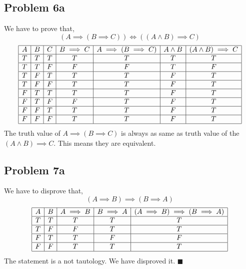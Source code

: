 \documentclass[answers]{exam}
\theoremstyle{mytheoremstyle}
\theoremstyle{mytheoremstyle}
\theoremstyle{myproblemstyle}
\begin{document}
\subsection*{Problem 6a}
\begin{framed}
	We have to prove that,
	\[(A\implies(B\implies C))\iff ((A\land B)\implies C)\]
	\begin{displaymath}
		\begin{array}{|c|c|c|c|c|c|c|}
			\hline
			A & B & C & B\implies C & A\implies(B\implies C) & A\land B & (A\land B)\implies C \\\hline
			T & T & T & T           & T                      & T        & T                    \\\hline
			T & T & F & F           & F                      & T        & F                    \\\hline
			T & F & T & T           & T                      & F        & T                    \\\hline
			T & F & F & T           & T                      & F        & T                    \\\hline
			F & T & T & T           & T                      & F        & T                    \\\hline
			F & T & F & F           & T                      & F        & T                    \\\hline
			F & F & T & T           & T                      & F        & T                    \\\hline
			F & F & F & T           & T                      & F        & T                    \\\hline
		\end{array}
	\end{displaymath}
	The truth value of \(A\implies(B\implies C)\) is always as same as truth value of the \((A\land B)\implies C\). This means they are equivalent.
\end{framed}

\subsection*{Problem 7a}
\begin{framed}
	We have to disprove that,
	\[(A\implies B)\implies (B\implies A)\]
	\begin{displaymath}
		\begin{array}{|c|c|c|c|c|c|}
			\hline
			A & B & A\implies B & B\implies A & (A\implies B)\implies (B\implies A) \\\hline
			T & T & T           & T           & T                                   \\\hline
			T & F & F           & T           & T                                   \\\hline
			F & T & T           & F           & F                                   \\\hline
			F & F & T           & T           & T                                   \\\hline
		\end{array}
	\end{displaymath}
	The statement is a not tautology. We have disproved it. \(\blacksquare\)
\end{framed}
\end{document}
